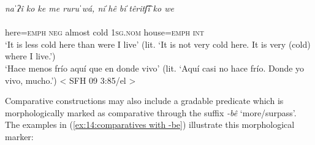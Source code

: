 \ea\label{ex:14:comparative by parataxis}

    \textit{naˈʔî  ko    ke  me    ruruˈwá,  niˈhê    biˈtêritʃ͡i  ko  we}\\
    \gll    [naˈʔî=ko    ke  me    ruruˈwá] [niˈhê    biˈtêritʃ͡i=ko  we]\\
            here=\textsc{emph}  \textsc{neg}  almost  cold  \textsc{1sg.nom} house=\textsc{emph} \textsc{int}\\
    \glt    `It is less cold here than were I live’ (lit. `It is not very cold here. It is very (cold) where I live.’)\\
    \glt    `Hace menos frío aquí que en donde vivo’ (lit. `Aquí casi no hace frío. Donde yo vivo, mucho.') < SFH 09 3:85/el >\\

\z

Comparative constructions may also include a gradable predicate which is morphologically marked as comparative through the suffix \textit{{}-bê} ‘more/surpass’. The examples in (\ref{ex:14:comparatives with -be}) illustrate this morphological marker:

\ea\label{ex:14:comparatives with -be}


